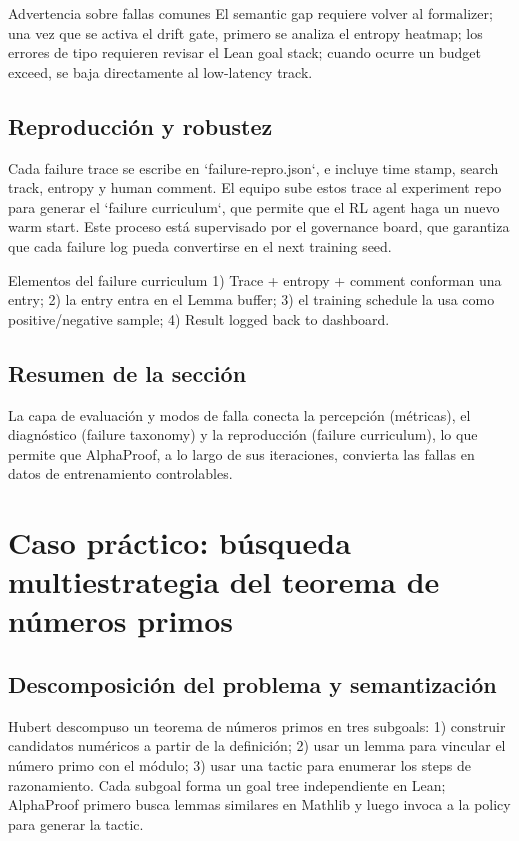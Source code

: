 \documentclass[a4paper]{article}
\begin{document}
\begin{warningbox}{Advertencia sobre fallas comunes}
El semantic gap requiere volver al formalizer; una vez que se activa el drift gate, primero se analiza el entropy heatmap; los errores de tipo requieren revisar el Lean goal stack; cuando ocurre un budget exceed, se baja directamente al low-latency track.
\end{warningbox}

\subsection{Reproducción y robustez}
Cada failure trace se escribe en `failure-repro.json`, e incluye time stamp, search track, entropy y human comment. El equipo sube estos trace al experiment repo para generar el `failure curriculum`, que permite que el RL agent haga un nuevo warm start. Este proceso está supervisado por el governance board, que garantiza que cada failure log pueda convertirse en el next training seed.

\begin{knowledgebox}{Elementos del failure curriculum}
1) Trace + entropy + comment conforman una entry; 2) la entry entra en el Lemma buffer; 3) el training schedule la usa como positive/negative sample; 4) Result logged back to dashboard.
\end{knowledgebox}

\subsection{Resumen de la sección}
La capa de evaluación y modos de falla conecta la percepción (métricas), el diagnóstico (failure taxonomy) y la reproducción (failure curriculum), lo que permite que AlphaProof, a lo largo de sus iteraciones, convierta las fallas en datos de entrenamiento controlables.
\newpage

\section{Caso práctico: búsqueda multiestrategia del teorema de números primos}

\subsection{Descomposición del problema y semantización}
Hubert descompuso un teorema de números primos en tres subgoals: 1) construir candidatos numéricos a partir de la definición; 2) usar un lemma para vincular el número primo con el módulo; 3) usar una tactic para enumerar los steps de razonamiento. Cada subgoal forma un goal tree independiente en Lean; AlphaProof primero busca lemmas similares en Mathlib y luego invoca a la policy para generar la tactic.
\end{document}
